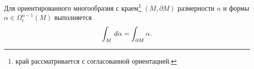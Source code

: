 \begin{to_thr}
     Для ориентированного многообразия с краем\footnote{
         край рассматривается с согласованной ориентацией.
     } $(M, \partial M)$ размерности $n$ и формы $\alpha \in \Omega_{\text{c}}^{n-1}(M)$ выполняется
     \begin{equation*}
         \int_M \, d \alpha = \int_{\partial M} \alpha.
     \end{equation*}
\end{to_thr}